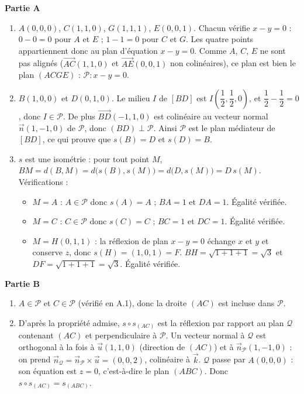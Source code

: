\documentclass[11pt]{article}
\newcommand{\cle}[1]{{\popxbold\color{popdark}#1}}
\begin{document}
\begin{corrige}
\textbf{Partie A}
\begin{enumerate}
\item $A(0,0,0)$, $C(1,1,0)$, $G(1,1,1)$, $E(0,0,1)$. Chacun vérifie $x-y=0$ : $0-0=0$ pour $A$ et $E$ ; $1-1=0$ pour $C$ et $G$. Les quatre points appartiennent donc au plan d'équation $x-y=0$. Comme $A$, $C$, $E$ ne sont pas alignés ($\overrightarrow{AC}(1,1,0)$ et $\overrightarrow{AE}(0,0,1)$ non colinéaires), ce plan est bien le plan $(ACGE)$ : $\mathcal{P}:x-y=0$.
\item $B(1,0,0)$ et $D(0,1,0)$. Le milieu $I$ de $[BD]$ est $I\left(\dfrac{1}{2},\dfrac{1}{2},0\right)$, et $\dfrac{1}{2}-\dfrac{1}{2}=0$, donc $I\in\mathcal{P}$. De plus $\overrightarrow{BD}(-1,1,0)$ est colinéaire au vecteur normal $\vec{n}(1,-1,0)$ de $\mathcal{P}$, donc $(BD)\perp\mathcal{P}$. Ainsi $\mathcal{P}$ est le plan médiateur de $[BD]$, ce qui prouve que $s(B)=D$ et $s(D)=B$.
\item $s$ est une isométrie : pour tout point $M$, $BM=d(B,M)=d\bigl(s(B),s(M)\bigr)=d\bigl(D,s(M)\bigr)=D\,s(M)$.
Vérifications :
\begin{itemize}
\item $M=A$ : $A\in\mathcal{P}$ donc $s(A)=A$ ; $BA=1$ et $DA=1$. Égalité vérifiée.
\item $M=C$ : $C\in\mathcal{P}$ donc $s(C)=C$ ; $BC=1$ et $DC=1$. Égalité vérifiée.
\item $M=H(0,1,1)$ : la réflexion de plan $x-y=0$ échange $x$ et $y$ et conserve $z$, donc $s(H)=(1,0,1)=F$. $BH=\sqrt{1+1+1}=\sqrt{3}$ et $DF=\sqrt{1+1+1}=\sqrt{3}$. Égalité vérifiée.
\end{itemize}
\end{enumerate}
\textbf{Partie B}
\begin{enumerate}
\item $A\in\mathcal{P}$ et $C\in\mathcal{P}$ (vérifié en A.1), donc la droite $(AC)$ est incluse dans $\mathcal{P}$.
\item D'après la propriété admise, $s\circ s_{(AC)}$ est la \cle{réflexion} par rapport au plan $\mathcal{Q}$ contenant $(AC)$ et perpendiculaire à $\mathcal{P}$. Un vecteur normal à $\mathcal{Q}$ est orthogonal à la fois à $\vec{u}(1,1,0)$ (direction de $(AC)$) et à $\vec{n}_{\mathcal{P}}(1,-1,0)$ : on prend $\vec{n}_{\mathcal{Q}}=\vec{n}_{\mathcal{P}}\times\vec{u}=(0,0,2)$, colinéaire à $\vec{k}$. $\mathcal{Q}$ passe par $A(0,0,0)$ : son équation est $z=0$, c'est-à-dire le plan $(ABC)$. Donc $s\circ s_{(AC)}=s_{(ABC)}$.

\end{enumerate}
\end{corrige}
\end{document}
